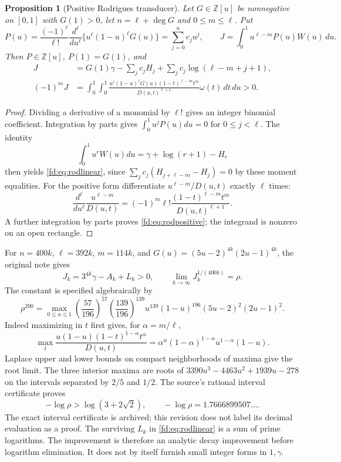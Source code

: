 \documentclass[11pt,a4paper]{article}
\newcommand{\Z}{\mathbb Z}
\newtheorem{proposition}[theorem]{Proposition}
\theoremstyle{definition}
\theoremstyle{remark}
\numberwithin{equation}{section}
\begin{document}
\begin{proposition}[Positive Rodrigues transducer]\label{fd:prop:rodrigues}
Let $G\in\Z[u]$ be nonnegative on $[0,1]$ with $G(1)>0$, let
$n=\ell+\deg G$ and $0\le m\le\ell$.  Put
\[
 P(u)=\frac{(-1)^\ell}{\ell!}\frac{d^\ell}{du^\ell}
       \{u^\ell(1-u)^\ell G(u)\}=\sum_{j=0}^n c_ju^j,
 \qquad J=\int_0^1u^{\ell-m}P(u)W(u)\,du.
\]
Then $P\in\Z[u]$, $P(1)=G(1)$, and
\begin{align}
 J&=G(1)\gamma-\sum_jc_jH_j+
                    \sum_jc_j\log(\ell-m+j+1),\label{fd:eq:rodlinear}\\
 (-1)^mJ&=\int_0^1\!\int_0^1
 \frac{u^\ell(1-u)^\ell G(u)(1-t)^{\ell-m}t^m}
 {D(u,t)^{\ell+1}}\omega(t)\,dt\,du>0.\label{fd:eq:rodpositive}
\end{align}
\end{proposition}
\begin{proof}
Dividing a derivative of a monomial by $\ell!$ gives an integer binomial
coefficient.  Integration by parts gives
$\int_0^1u^jP(u)du=0$ for $0\le j<\ell$.
The identity
\[
 \int_0^1u^rW(u)du=\gamma+\log(r+1)-H_r
\]
then yields \eqref{fd:eq:rodlinear}, since
$\sum_jc_j(H_{j+\ell-m}-H_j)=0$ by these moment equalities.
For the positive form differentiate $u^{\ell-m}/D(u,t)$ exactly $\ell$
times:
\[
 \frac{d^\ell}{du^\ell}\frac{u^{\ell-m}}{D(u,t)}
 =(-1)^m\ell!\frac{(1-t)^{\ell-m}t^m}{D(u,t)^{\ell+1}}.
\]
A further integration by parts proves \eqref{fd:eq:rodpositive}; the
integrand is nonzero on an open rectangle.
\end{proof}

For $n=400k$, $\ell=392k$, $m=114k$, and
$G(u)=(5u-2)^{4k}(2u-1)^{4k}$, the original note gives
\[
 J_k=3^{4k}\gamma-A_k+L_k>0,
 \qquad\lim_{k\to\infty}J_k^{1/(400k)}=\rho.
\]
The constant is specified algebraically by
\[
 \rho^{200}=\max_{0\le u\le1}
 \left(\frac{57}{196}\right)^{57}
 \left(\frac{139}{196}\right)^{139}
 u^{139}(1-u)^{196}(5u-2)^2(2u-1)^2.
\]
Indeed maximizing in $t$ first gives, for $\alpha=m/\ell$,
\[
 \max_t\frac{u(1-u)(1-t)^{1-\alpha}t^\alpha}{D(u,t)}
 =\alpha^\alpha(1-\alpha)^{1-\alpha}u^{1-\alpha}(1-u).
\]
Laplace upper and lower bounds on compact neighborhoods of maxima give
the root limit.  The three interior maxima are roots of
$3390u^3-4463u^2+1939u-278$ on the intervals separated by $2/5$ and
$1/2$.  The source's rational interval certificate proves
\[
 -\log\rho>\log(3+2\sqrt2),\qquad
 -\log\rho=1.7666899507\ldots.
\]
The exact interval certificate is archived; this revision does not label
its decimal evaluation as a proof.  The surviving $L_k$ in
\eqref{fd:eq:rodlinear} is a sum of prime logarithms.  The improvement is
therefore an analytic decay improvement before logarithm elimination.
It does not by itself furnish small integer forms in $1,\gamma$.
\end{document}
